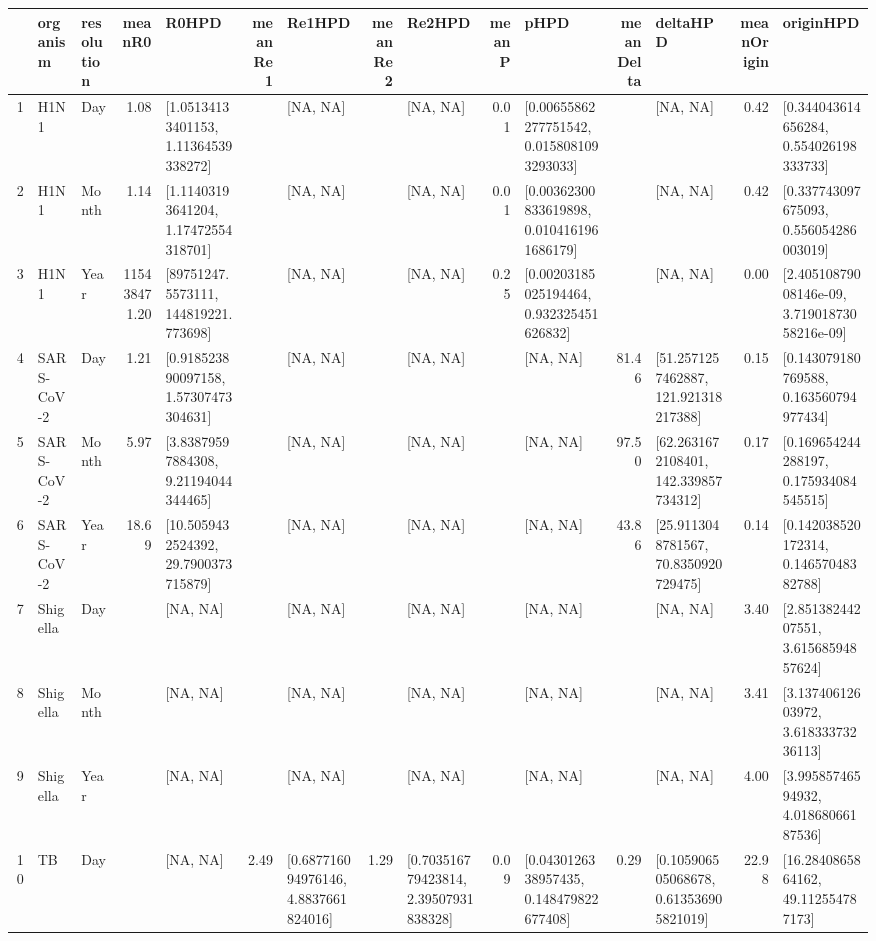 \begin{table}[ht]
\centering
\begin{tabular}{rllrlrlrlrlrlrl}
  \hline
 & organism & resolution & meanR0 & R0HPD & meanRe1 & Re1HPD & meanRe2 & Re2HPD & meanP & pHPD & meanDelta & deltaHPD & meanOrigin & originHPD \\ 
  \hline
1 & H1N1 & Day & 1.08 & [1.05134133401153, 1.11364539338272] &  & [NA, NA] &  & [NA, NA] & 0.01 & [0.00655862277751542, 0.0158081093293033] &  & [NA, NA] & 0.42 & [0.344043614656284, 0.554026198333733] \\ 
  2 & H1N1 & Month & 1.14 & [1.11403193641204, 1.17472554318701] &  & [NA, NA] &  & [NA, NA] & 0.01 & [0.00362300833619898, 0.0104161961686179] &  & [NA, NA] & 0.42 & [0.337743097675093, 0.556054286003019] \\ 
  3 & H1N1 & Year & 115438471.20 & [89751247.5573111, 144819221.773698] &  & [NA, NA] &  & [NA, NA] & 0.25 & [0.00203185025194464, 0.932325451626832] &  & [NA, NA] & 0.00 & [2.40510879008146e-09, 3.71901873058216e-09] \\ 
  4 & SARS-CoV-2 & Day & 1.21 & [0.918523890097158, 1.57307473304631] &  & [NA, NA] &  & [NA, NA] &  & [NA, NA] & 81.46 & [51.2571257462887, 121.921318217388] & 0.15 & [0.143079180769588, 0.163560794977434] \\ 
  5 & SARS-CoV-2 & Month & 5.97 & [3.83879597884308, 9.21194044344465] &  & [NA, NA] &  & [NA, NA] &  & [NA, NA] & 97.50 & [62.2631672108401, 142.339857734312] & 0.17 & [0.169654244288197, 0.175934084545515] \\ 
  6 & SARS-CoV-2 & Year & 18.69 & [10.5059432524392, 29.7900373715879] &  & [NA, NA] &  & [NA, NA] &  & [NA, NA] & 43.86 & [25.9113048781567, 70.8350920729475] & 0.14 & [0.142038520172314, 0.14657048382788] \\ 
  7 & Shigella & Day &  & [NA, NA] &  & [NA, NA] &  & [NA, NA] &  & [NA, NA] &  & [NA, NA] & 3.40 & [2.85138244207551, 3.61568594857624] \\ 
  8 & Shigella & Month &  & [NA, NA] &  & [NA, NA] &  & [NA, NA] &  & [NA, NA] &  & [NA, NA] & 3.41 & [3.13740612603972, 3.61833373236113] \\ 
  9 & Shigella & Year &  & [NA, NA] &  & [NA, NA] &  & [NA, NA] &  & [NA, NA] &  & [NA, NA] & 4.00 & [3.99585746594932, 4.01868066187536] \\ 
  10 & TB & Day &  & [NA, NA] & 2.49 & [0.687716094976146, 4.8837661824016] & 1.29 & [0.703516779423814, 2.39507931838328] & 0.09 & [0.0430126338957435, 0.148479822677408] & 0.29 & [0.105906505068678, 0.613536905821019] & 22.98 & [16.2840865864162, 49.112554787173] \\ 

\end{tabular}
\end{table}
